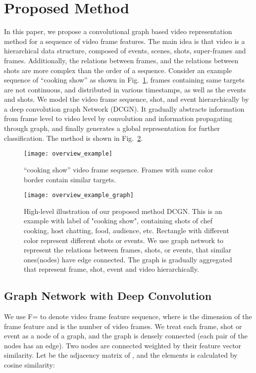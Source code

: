\documentclass[runningheads]{llncs}
\begin{document}
\section{Proposed Method}

In this paper, we propose a convolutional graph based video representation method for a sequence of video frame features. The main idea is that video is a hierarchical data structure, composed of events, scenes, shots, super-frames and frames. Additionally, the relations between frames, and the relations between shots are more complex than the order of a sequence. Consider an example sequence of “cooking show” as shown in Fig.~\ref{fig:overview_example}, frames containing same targets are not continuous, and distributed in various timestamps, as well as the events and shots. 
We model the video frame sequence, shot, and event hierarchically by a deep convolution graph Network (DCGN). It gradually abstracts information from frame level to video level by convolution and information propagating through graph, and finally generates a global representation for further classification. The method is shown in Fig.~\ref{fig:overview_example_graph}.

\begin{figure}
\centering
    \texttt{[image: overview\_example]}
    \caption{“cooking show” video frame sequence. Frames with same color border contain similar targets.}
    \label{fig:overview_example}
\end{figure}

\begin{figure}
\centering
    \texttt{[image: overview\_example\_graph]}
\caption{High-level illustration of our proposed method DCGN. This is an example with label of "cooking show", containing shots of chef cooking, host chatting, food, audience, etc. Rectangle with different color represent different shots or events. We use graph network to represent the relations between frames, shots, or events, that similar ones(nodes) have edge connected. The graph is gradually aggregated that represent frame, shot, event and video hierarchically. }
\label{fig:overview_example_graph}
\end{figure}


\subsection{Graph Network with Deep Convolution}

We use F= to denote video frame feature sequence, where  is the dimension of the frame feature and  is the number of video frames. We treat each frame, shot or event as a node of a graph, and the graph is densely connected (each pair of the nodes has an edge). Two nodes are connected weighted by their feature vector similarity. Let  be the adjacency matrix of , and the elements is calculated by cosine similarity:
\end{document}
